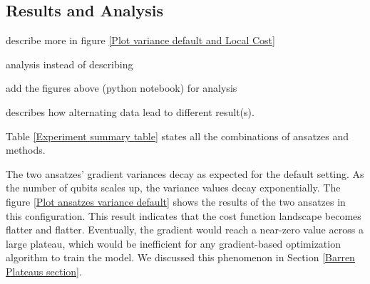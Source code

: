 \subsection{Results and Analysis} \label{Result section}

\begin{todolist}
    \item describe more in figure \ref{Plot variance default and Local Cost}
    \item analysis instead of describing
    \item add the figures above (python notebook) for analysis
    \item describes how alternating data lead to different result(s).
\end{todolist}

Table \ref{Experiment summary table} states all the combinations of ansatzes and methods.

The two ansatzes' gradient variances decay as expected for the default setting.
As the number of qubits scales up, the variance values decay exponentially.
The figure \ref{Plot ansatzes variance default} shows the results of the two ansatzes in this configuration.
This result indicates that the cost function landscape becomes flatter and flatter.
Eventually, the gradient would reach a near-zero value across a large plateau, which would be inefficient for any gradient-based optimization algorithm to train the model.
We discussed this phenomenon in Section \ref{Barren Plateaus section}.


